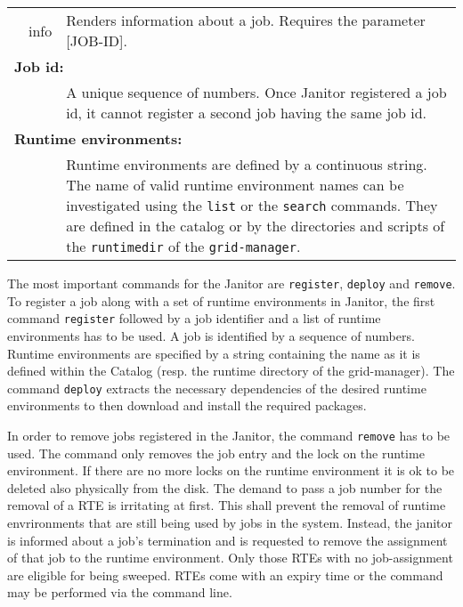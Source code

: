 \begin{table}[!h]
\begin{center}
\begin{tabular}{p{0.5cm}p{2cm}p{11cm}}
	&	info		& Renders information about a job. Requires the parameter [JOB-ID].\\
	\multicolumn{3}{l}{\textbf{Job id:}}\\
	&			& A unique sequence of numbers. Once Janitor registered a job id, it
				  cannot register a second job having the same job id.\\
	\multicolumn{3}{l}{\textbf{Runtime environments:}}\\
	&			& Runtime environments are defined by a continuous string.
				  The name of valid runtime environment names can be investigated using
				  the \texttt{list} or the \texttt{search} commands. They are defined in
				  the catalog or by the directories and scripts of the \texttt{runtimedir}
				  of the \texttt{grid-manager}.\\
	\end{tabular} 
   \end{center}
\end{table}

The most important commands for the Janitor are \texttt{register},
\texttt{deploy} and \texttt{remove}. To register a job along with a set
of runtime environments in Janitor, the first command \texttt{register}
followed by a job identifier and a list of runtime environments has to be
used.  A job is identified by a sequence of numbers. Runtime environments
are specified by a string containing the name as it is defined within
the Catalog (resp. the runtime directory of the grid-manager).
The command \texttt{deploy} extracts the necessary dependencies of the
desired runtime environments to then download and install the required
packages.


In order to remove jobs registered in the Janitor, the command
\texttt{remove} has to be used.  The command only removes the job
entry and the lock on the runtime environment. If there are no more
locks on the runtime environment it is ok to be deleted also physically
from the disk.  The demand to pass a job number for the removal of a
RTE is irritating at first.  This shall prevent the removal of runtime
envrironments that are still being used by jobs in the system. Instead,
the janitor is informed about a job's termination and is requested to
remove the assignment of that job to the runtime environment. Only those
RTEs with no job-assignment are eligible for being sweeped. RTEs come
with an expiry time or the command may be performed via the command line.

